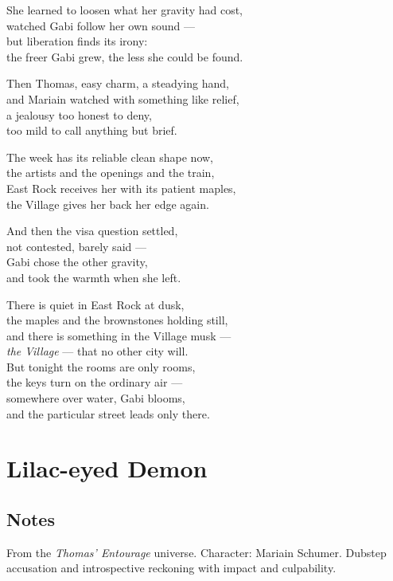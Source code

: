 \begin{lyrics}
She learned to loosen what her gravity had cost,\\
watched Gabi follow her own sound —\\
but liberation finds its irony:\\
the freer Gabi grew, the less she could be found.

Then Thomas, easy charm, a steadying hand,\\
and Mariain watched with something like relief,\\
a jealousy too honest to deny,\\
too mild to call anything but brief.

The week has its reliable clean shape now,\\
the artists and the openings and the train,\\
East Rock receives her with its patient maples,\\
the Village gives her back her edge again.

And then the visa question settled,\\
not contested, barely said —\\
Gabi chose the other gravity,\\
and took the warmth when she left.

There is quiet in East Rock at dusk,\\
the maples and the brownstones holding still,\\
and there is something in the Village musk —\\
\emph{the Village} — that no other city will.\\
But tonight the rooms are only rooms,\\
the keys turn on the ordinary air —\\
somewhere over water, Gabi blooms,\\
and the particular street leads only there.

\end{lyrics}

\section{Lilac-eyed Demon}

\subsection{Notes}
From the \emph{Thomas' Entourage} universe.
Character: Mariain Schumer.
Dubstep accusation and introspective reckoning with impact and culpability.

